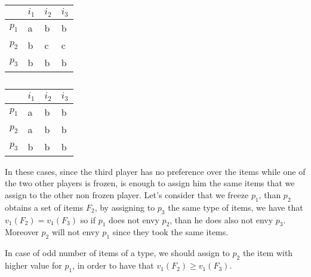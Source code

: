 \documentclass{article}
\begin{document}
\begin{table}[!htb]
    \begin{minipage}{.5\linewidth}
      \centering
        \begin{tabular}{|l|l|l|l|}
            \hline
                  & $i_1$ & $i_2$ & $i_3$ \\ \hline
            $p_1$ & a     & b     & b     \\ \hline
            $p_2$ & b     & c     & c     \\ \hline
            $p_3$ & b     & b     & b     \\ \hline
            
        \end{tabular}
        \caption{}
        \label{table:3-players-abb-bcc-bbb-const}
    \end{minipage}%
    \begin{minipage}{.5\linewidth}
      \centering
        \begin{tabular}{|l|l|l|l|}
            \hline
                  & $i_1$ & $i_2$ & $i_3$ \\ \hline
            $p_1$ & a     & b     & b     \\ \hline
            $p_2$ & a     & b     & b     \\ \hline
            $p_3$ & b     & b     & b     \\ \hline
        \end{tabular}
        \caption{}
        \label{table:3-players-abb-abb-bbb-const}
    \end{minipage} 
\end{table}

In these cases, since the third player has no preference over the items while one of the two other players is frozen, is enough to assign him the same items that we assign to the other non frozen player. Let's consider that we freeze $p_1$, than $p_2$ obtains a set of items $F_2$, by assigning to $p_3$ the same type of items, we have that $v_1(F_2) = v_1(F_3)$ so if $p_1$ does not envy $p_2$, than he does also not envy $p_3$. Moreover $p_2$ will not envy $p_1$ since they took the same items.

In case of odd number of items of a type, we should assign to $p_2$ the item with higher value for $p_1$, in order to have that $v_1(F_2) \ge v_1(F_3)$.
\end{document}
